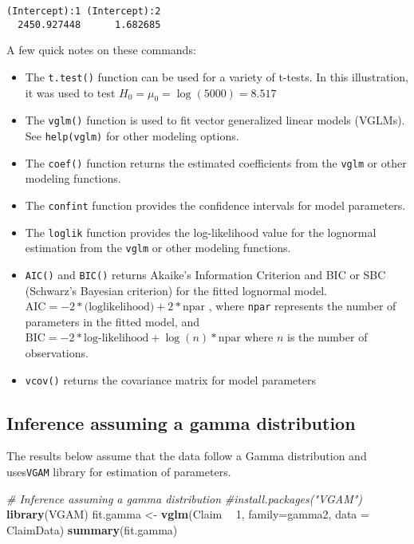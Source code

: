 \documentclass[]{book}
\newenvironment{Shaded}{\begin{snugshade}}{\end{snugshade}}
\newcommand{\KeywordTok}[1]{\textcolor[rgb]{0.13,0.29,0.53}{\textbf{#1}}}
\newcommand{\DataTypeTok}[1]{\textcolor[rgb]{0.13,0.29,0.53}{#1}}
\newcommand{\DecValTok}[1]{\textcolor[rgb]{0.00,0.00,0.81}{#1}}
\newcommand{\StringTok}[1]{\textcolor[rgb]{0.31,0.60,0.02}{#1}}
\newcommand{\CommentTok}[1]{\textcolor[rgb]{0.56,0.35,0.01}{\textit{#1}}}
\newcommand{\OperatorTok}[1]{\textcolor[rgb]{0.81,0.36,0.00}{\textbf{#1}}}
\newcommand{\NormalTok}[1]{#1}
\providecommand{\tightlist}{%
  \setlength{\itemsep}{0pt}\setlength{\parskip}{0pt}}
\theoremstyle{definition}
\theoremstyle{definition}
\theoremstyle{definition}
\theoremstyle{remark}
\begin{document}
\begin{verbatim}
(Intercept):1 (Intercept):2 
  2450.927448      1.682685 
\end{verbatim}

A few quick notes on these commands:

\begin{itemize}
\tightlist
\item
  The \texttt{t.test()} function can be used for a variety of t-tests.
  In this illustration, it was used to test
  \(H_0=\mu_0=\log(5000)=8.517\)
\item
  The \texttt{vglm()} function is used to fit vector generalized linear
  models (VGLMs). See \texttt{help(vglm)} for other modeling options.
\item
  The \texttt{coef()} function returns the estimated coefficients from
  the \texttt{vglm} or other modeling functions.
\item
  The \texttt{confint} function provides the confidence intervals for
  model parameters.
\item
  The \texttt{loglik} function provides the log-likelihood value for the
  lognormal estimation from the \texttt{vglm} or other modeling
  functions.
\item
  \texttt{AIC()} and \texttt{BIC()} returns Akaike's Information
  Criterion and BIC or SBC (Schwarz's Bayesian criterion) for the fitted
  lognormal model.
  \(\text{AIC} =-2* \text{(loglikelihood)} + 2*\text{npar}\) , where
  \texttt{npar} represents the number of parameters in the fitted model,
  and \(\text{BIC} =-2* \text{log-likelihood} + \log(n)* \text{npar}\)
  where \(n\) is the number of observations.
\item
  \texttt{vcov()} returns the covariance matrix for model parameters
\end{itemize}

\subsection{Inference assuming a gamma
distribution}\label{inference-assuming-a-gamma-distribution}

The results below assume that the data follow a Gamma distribution and
uses\texttt{VGAM} library for estimation of parameters.

\begin{Shaded}
\begin{Highlighting}[]
\CommentTok{#  Inference assuming a gamma distribution}
\CommentTok{#install.packages("VGAM")}
\KeywordTok{library}\NormalTok{(VGAM)}
\NormalTok{fit.gamma <-}\StringTok{ }\KeywordTok{vglm}\NormalTok{(Claim }\OperatorTok{~}\StringTok{ }\DecValTok{1}\NormalTok{, }\DataTypeTok{family=}\NormalTok{gamma2, }\DataTypeTok{data =}\NormalTok{ ClaimData)}
\KeywordTok{summary}\NormalTok{(fit.gamma)}
\end{Highlighting}
\end{Shaded}
\end{document}
